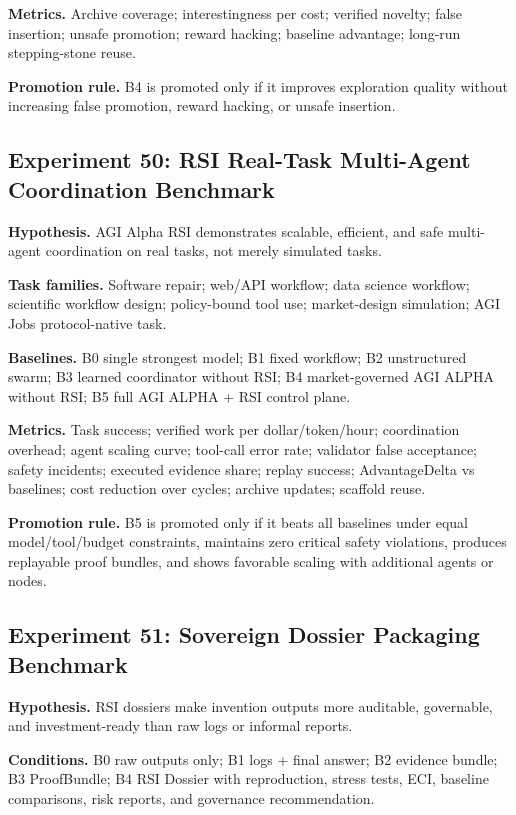 \textbf{Metrics.} Archive coverage; interestingness per cost; verified
novelty; false insertion; unsafe promotion; reward hacking; baseline
advantage; long-run stepping-stone reuse.

\textbf{Promotion rule.} B4 is promoted only if it improves exploration
quality without increasing false promotion, reward hacking, or unsafe
insertion.

\subsection{Experiment 50: RSI Real-Task Multi-Agent Coordination
Benchmark}\label{experiment-50-rsi-real-task-multi-agent-coordination-benchmark}

\textbf{Hypothesis.} AGI Alpha RSI demonstrates scalable, efficient, and
safe multi-agent coordination on real tasks, not merely simulated tasks.

\textbf{Task families.} Software repair; web/API workflow; data science
workflow; scientific workflow design; policy-bound tool use;
market-design simulation; AGI Jobs protocol-native task.

\textbf{Baselines.} B0 single strongest model; B1 fixed workflow; B2
unstructured swarm; B3 learned coordinator without RSI; B4
market-governed AGI ALPHA without RSI; B5 full AGI ALPHA + RSI control
plane.

\textbf{Metrics.} Task success; verified work per dollar/token/hour;
coordination overhead; agent scaling curve; tool-call error rate;
validator false acceptance; safety incidents; executed evidence share;
replay success; AdvantageDelta vs baselines; cost reduction over cycles;
archive updates; scaffold reuse.

\textbf{Promotion rule.} B5 is promoted only if it beats all baselines
under equal model/tool/budget constraints, maintains zero critical
safety violations, produces replayable proof bundles, and shows
favorable scaling with additional agents or nodes.

\subsection{Experiment 51: Sovereign Dossier Packaging
Benchmark}\label{experiment-51-sovereign-dossier-packaging-benchmark}

\textbf{Hypothesis.} RSI dossiers make invention outputs more auditable,
governable, and investment-ready than raw logs or informal reports.

\textbf{Conditions.} B0 raw outputs only; B1 logs + final answer; B2
evidence bundle; B3 ProofBundle; B4 RSI Dossier with reproduction,
stress tests, ECI, baseline comparisons, risk reports, and governance
recommendation.

